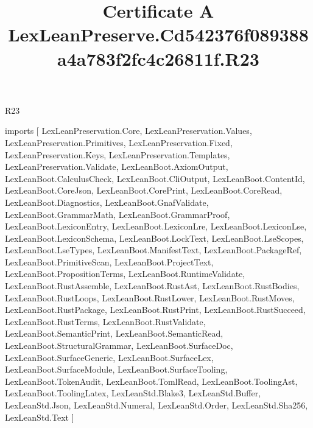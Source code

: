 \begin{lexlean}{R23}
\title{Certificate A LexLeanPreserve.Cd542376f089388a4a783f2fc4c26811f.R23}
\begin{coremodule}
imports [
  LexLeanPreservation.Core,
  LexLeanPreservation.Values,
  LexLeanPreservation.Primitives,
  LexLeanPreservation.Fixed,
  LexLeanPreservation.Keys,
  LexLeanPreservation.Templates,
  LexLeanPreservation.Validate,
  LexLeanBoot.AxiomOutput,
  LexLeanBoot.CalculusCheck,
  LexLeanBoot.CliOutput,
  LexLeanBoot.ContentId,
  LexLeanBoot.CoreJson,
  LexLeanBoot.CorePrint,
  LexLeanBoot.CoreRead,
  LexLeanBoot.Diagnostics,
  LexLeanBoot.GnafValidate,
  LexLeanBoot.GrammarMath,
  LexLeanBoot.GrammarProof,
  LexLeanBoot.LexiconEntry,
  LexLeanBoot.LexiconLre,
  LexLeanBoot.LexiconLse,
  LexLeanBoot.LexiconSchema,
  LexLeanBoot.LockText,
  LexLeanBoot.LseScopes,
  LexLeanBoot.LseTypes,
  LexLeanBoot.ManifestText,
  LexLeanBoot.PackageRef,
  LexLeanBoot.PrimitiveScan,
  LexLeanBoot.ProjectText,
  LexLeanBoot.PropositionTerms,
  LexLeanBoot.RuntimeValidate,
  LexLeanBoot.RustAssemble,
  LexLeanBoot.RustAst,
  LexLeanBoot.RustBodies,
  LexLeanBoot.RustLoops,
  LexLeanBoot.RustLower,
  LexLeanBoot.RustMoves,
  LexLeanBoot.RustPackage,
  LexLeanBoot.RustPrint,
  LexLeanBoot.RustSucceed,
  LexLeanBoot.RustTerms,
  LexLeanBoot.RustValidate,
  LexLeanBoot.SemanticPrint,
  LexLeanBoot.SemanticRead,
  LexLeanBoot.StructuralGrammar,
  LexLeanBoot.SurfaceDoc,
  LexLeanBoot.SurfaceGeneric,
  LexLeanBoot.SurfaceLex,
  LexLeanBoot.SurfaceModule,
  LexLeanBoot.SurfaceTooling,
  LexLeanBoot.TokenAudit,
  LexLeanBoot.TomlRead,
  LexLeanBoot.ToolingAst,
  LexLeanBoot.ToolingLatex,
  LexLeanStd.Blake3,
  LexLeanStd.Buffer,
  LexLeanStd.Json,
  LexLeanStd.Numeral,
  LexLeanStd.Order,
  LexLeanStd.Sha256,
  LexLeanStd.Text
]


\end{coremodule}
\end{lexlean}
